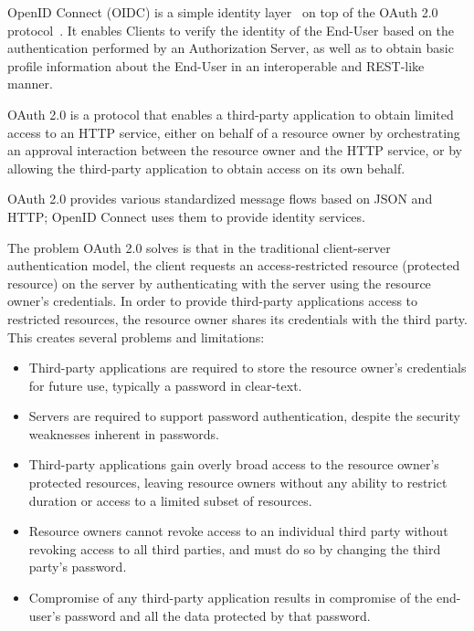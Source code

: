 OpenID Connect (OIDC) is a simple identity layer~\cite{siriwardenaOpenid2020, sakimuraOpenid2014}
on top of the OAuth 2.0 protocol~\cite{hardt2012oauth}.
It enables Clients to verify the identity of the End-User based on the authentication performed by an Authorization Server,
as well as to obtain basic profile information about the End-User in an interoperable and REST-like manner.

OAuth 2.0 is a protocol that enables a third-party application to obtain limited access to an HTTP service,
either on behalf of a resource owner by orchestrating an approval interaction between the resource owner
and the HTTP service, or by allowing the third-party application to obtain access on its own behalf.

OAuth 2.0 provides various standardized message flows based on JSON and HTTP;
OpenID Connect uses them to provide identity services.

The problem OAuth 2.0 solves is that in the traditional client-server authentication model,
the client requests an access-restricted resource (protected resource)
on the server by authenticating with the server using the resource owner's credentials.
In order to provide third-party applications access to restricted resources,
the resource owner shares its credentials with the third party.
This creates several problems and limitations:

\begin{itemize}
    \item Third-party applications are required to store the resource owner's credentials for future use, typically
    a password in clear-text.
    \item Servers are required to support password authentication, despite the security weaknesses inherent in passwords.
    \item Third-party applications gain overly broad access to the resource owner's protected resources,
    leaving resource owners without any ability to restrict duration or access to a limited subset of resources.
    \item Resource owners cannot revoke access to an individual third party without revoking access to all third parties,
    and must do so by changing the third party's password.
    \item Compromise of any third-party application results in compromise of the end-user's password
    and all the data protected by that password.
\end{itemize}

